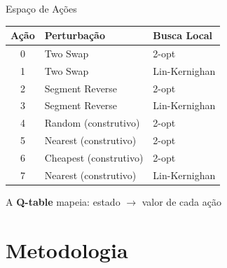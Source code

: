 \documentclass[11pt, xcolor=dvipsnames]{beamer}
\newcommand{\destaque}[1]{\textbf{\textcolor{verde}{#1}}}
\begin{document}
\begin{frame}{Espaço de Ações}
  \footnotesize
  \centering
  \renewcommand{\arraystretch}{1.2}
  \begin{tabular}{cll}
    \toprule
    \textbf{Ação} & \textbf{Perturbação} & \textbf{Busca Local} \\
    \midrule
    0 & Two Swap & 2-opt \\
    1 & Two Swap & Lin-Kernighan \\
    2 & Segment Reverse & 2-opt \\
    3 & Segment Reverse & Lin-Kernighan \\
    4 & Random (construtivo) & 2-opt \\
    5 & Nearest (construtivo) & 2-opt \\
    6 & Cheapest (construtivo) & 2-opt \\
    7 & Nearest (construtivo) & Lin-Kernighan \\
    \bottomrule
  \end{tabular}
  \vspace{3mm}

  {\scriptsize A \destaque{Q-table} mapeia: estado $\rightarrow$ valor de cada ação}
\end{frame}

\section{Metodologia}
\end{document}
